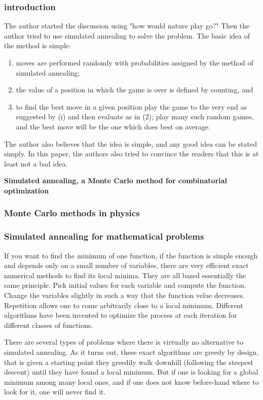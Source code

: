 \subsubsection{introduction}
The author started the discussion using "how would nature play go?" Then the author tried to use simulated annealing to solve the problem. The basic idea of the method is simple: 
\begin{enumerate}
	\item moves are performed randomly with probabilities assigned by the method of simulated annealing;
	\item the value of a position in which the game is over is defined by counting, and 
	\item to find the best move in a given position play the game to the very end as suggested by (i) and then evaluate as in (2); play many such random games, and the best move will be the one which does best on average.
\end{enumerate}
The author also believes that the idea is simple, and any good idea can be stated simply. In this paper, the authors also tried to convince the readers that this is at least not a bad idea.

\textbf{Simulated annealing, a Monte Carlo method for combinatorial optimization}
\subsubsection{Monte Carlo methods in physics}
\subsubsection{Simulated annealing for mathematical problems}
If you want to find the minimum of one function, if the function is simple enough and depends only on a small number of variables, there are very efficient exact numerical methods to find its local minima. They are all based essentially the same principle. Pick initial values for each variable and compute the function. Change the variables slightly in such a way that the function velue decreases. Repetition allows one to come arbitrarily close to a local minimum. Different algorithms have been invented to optimize the process at each iteration for different classes of functions.

There are several types of problems where there is virtually no alternative to simulated annealing. As it turns out, these exact algorithms are greedy by design, that is given a starting point they greedily walk downhill (following the steepest descent) until they have found a local minimum. But if one is looking for a global minimum among many local ones, and if one does not know before-hand where to look for it, one will never find it.

